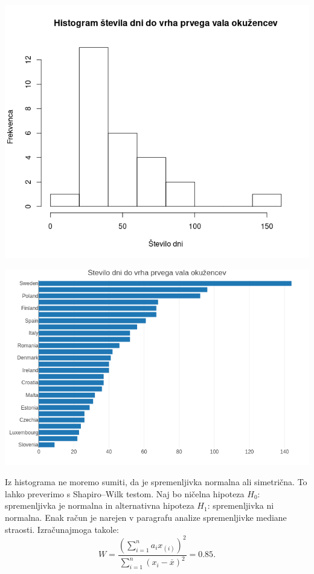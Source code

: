\documentclass[a4paper,11pt]{article}
\begin{document}
\begin{center}
\includegraphics[scale=0.6]{histogram_st_dni_do_peaka_okuzencev}\\
\end{center}
\begin{center}
\includegraphics[scale=0.6]{barplot_st_dni_do_peaka_okuzencev}\\
\end{center}
Iz histograma ne moremo sumiti, da je spremenljivka normalna ali simetrična. To lahko preverimo s Shapiro–Wilk testom. Naj bo ničelna hipoteza \(H_0\): spremenljivka je normalna in alternativna hipoteza \(H_1\): spremenljivka ni normalna. Enak račun je narejen v paragrafu analize spremenljivke mediane straosti. Izračunajmoga takole:
\[W = \frac{(\sum_{i = 1}^{n}a_i x_{(i)})^2}{\sum_{i = 1}^{n}(x_i - \overset{\_}{x})^2} = 0.85.\]
\end{document}
